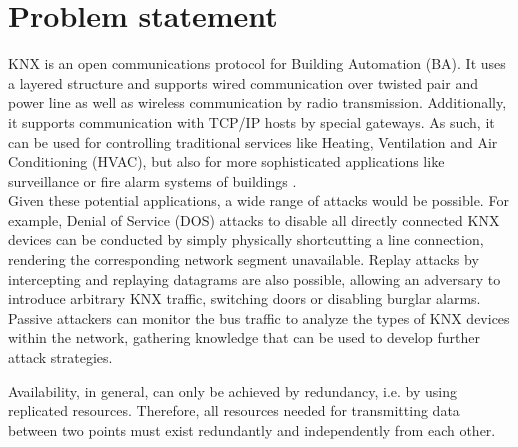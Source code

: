 \documentclass[a4paper,11pt,oneside]{memoir}
\begin{document}
\captionnamefont{\bfseries}

\frontmatter
{}





\section{Problem statement}

KNX is an open communications protocol for Building Automation (BA).
It uses a layered structure and supports wired communication over twisted pair
and power line as well as wireless communication by radio transmission. 
Additionally, it supports communication with TCP/IP hosts by special gateways. 
As such, it can be used for controlling traditional services like Heating, Ventilation and Air Conditioning (HVAC), but also for more
sophisticated applications 
like surveillance or fire alarm systems of buildings \cite{knxapps}.
\\
Given these potential applications, a wide range of attacks would be possible. For example, Denial of Service (DOS) attacks to disable all directly connected
KNX devices can be conducted by simply physically shortcutting a line
connection, rendering the corresponding network segment unavailable.
Replay attacks by intercepting and replaying datagrams are also possible, allowing an adversary to introduce arbitrary KNX traffic, switching doors
or disabling burglar alarms. Passive attackers can monitor the bus traffic to analyze the types of KNX devices within the network, gathering knowledge that can be used
to develop further attack strategies.

Availability, in general, can only be achieved by redundancy, i.e. by using replicated resources. Therefore, all
resources needed for transmitting data between two points must exist redundantly and independently from 
each other.
\end{document}
